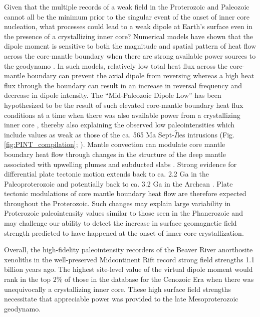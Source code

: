 \documentclass[9pt,twocolumn,twoside,lineno]{pnas-new}
\begin{document}
Given that the multiple records of a weak field in the Proterozoic and Paleozoic cannot all be the minimum prior to the singular event of the onset of inner core nucleation, what processes could lead to a weak dipole at Earth's surface even in the presence of a crystallizing inner core? Numerical models have shown that the dipole moment is sensitive to both the magnitude and spatial pattern of heat flow across the core-mantle boundary when there are strong available power sources to the geodynamo \cite{Olson2007a, Olson2010a}. In such models, relatively low total heat flux across the core-mantle boundary can prevent the axial dipole from reversing whereas a high heat flux through the boundary can result in an increase in reversal frequency and decrease in dipole intensity. The ``Mid-Paleozoic Dipole Low'' has been hypothesized to be the result of such elevated core-mantle boundary heat flux conditions at a time when there was also available power from a crystallizing inner core \cite{Hawkins2019a}, thereby also explaining the observed low paleointensities which include values as weak as those of the ca. 565 Ma Sept-$\hat{I}$les intrusions (Fig. \ref{fig:PINT_compilation}; \citealp{Bono2019a}). Mantle convection can modulate core mantle boundary heat flow through changes in the structure of the deep mantle associated with upwelling plumes \cite{Larson1991a, Courtillot2007a} and subducted slabs \cite{Tan2002b, Biggin2012a, Hounslow2018a}. Strong evidence for differential plate tectonic motion extends back to ca. 2.2 Ga in the Paleoproterozoic \cite{Mitchell2014a,Swanson-Hysell2021b} and potentially back to ca. 3.2 Ga in the Archean \cite{Brenner2020a}. Plate tectonic modulations of core mantle boundary heat flow are therefore expected throughout the Proterozoic. Such changes may explain large variability in Proterozoic paleointensity values similar to those seen in the Phanerozoic \cite{Lloyd2021a} and may challenge our ability to detect the increase in surface geomagnetic field strength predicted to have happened at the onset of inner core crystallization. 

Overall, the high-fidelity paleointensity recorders of the Beaver River anorthosite xenoliths in the well-preserved Midcontinent Rift record strong field strengths 1.1 billion years ago. The highest site-level value of the virtual dipole moment would rank in the top 2$\%$ of those in the database for the Cenozoic Era when there was unequivocally a crystallizing inner core. These high surface field strengths necessitate that appreciable power was provided to the late Mesoproterozoic geodynamo. 
\end{document}

